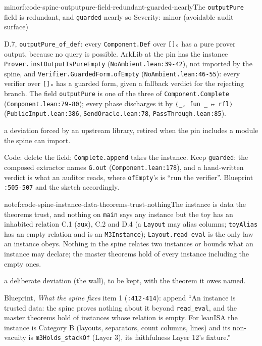 \begin{finding}{minor}{f:code-spine-outputpure-field-redundant-guarded-nearly}{The \texttt{outputPure} field is redundant, and \texttt{guarded} nearly so}
Severity: minor (avoidable audit surface)

D.7, \texttt{outputPure\_\allowbreak{}of\_\allowbreak{}def}: every \texttt{Component.\allowbreak{}Def} over \texttt{[]ₒ} has a pure prover output, because no query is possible. ArkLib at the pin has the instance \texttt{Prover.\allowbreak{}instOutputIsPureEmpty} (\texttt{NoAmbient.\allowbreak{}lean:39-{}42}), not imported by the spine, and \texttt{Verifier.\allowbreak{}GuardedForm.\allowbreak{}ofEmpty} (\texttt{NoAmbient.\allowbreak{}lean:46-{}55}): every verifier over \texttt{[]ₒ} has a guarded form, given a fallback verdict for the rejecting branch. The field \texttt{outputPure} is one of the three of \texttt{Component.\allowbreak{}Complete} (\texttt{Component.\allowbreak{}lean:79-{}80}); every phase discharges it by \texttt{⟨\_\allowbreak{},\allowbreak{} fun \_\allowbreak{} ↦ rfl⟩} (\texttt{PublicInput.\allowbreak{}lean:386}, \texttt{SendOracle.\allowbreak{}lean:78}, \texttt{PassThrough.\allowbreak{}lean:85}).

a deviation forced by an upstream library, retired when the pin includes a module the spine can import.

Code: delete the field; \texttt{Complete.\allowbreak{}append} takes the instance. Keep \texttt{guarded}: the composed extractor names \texttt{G.\allowbreak{}out} (\texttt{Component.\allowbreak{}lean:178}), and a hand-written verdict is what an auditor reads, where \texttt{ofEmpty}'s is \enquote{run the verifier}. Blueprint \texttt{:505-{}507} and the sketch accordingly.

\end{finding}

\begin{finding}{note}{f:code-spine-instance-data-theorems-trust-nothing}{The instance is data the theorems trust, and nothing on \texttt{main} says any instance but the toy has an inhabited relation}
C.1 (\texttt{aux}), C.2 and D.4 (a \texttt{Layout} may alias columns; \texttt{toyAlias} has an empty relation and is an \texttt{M3Instance}); \texttt{Layout.\allowbreak{}read\_\allowbreak{}eval} is the only law an instance obeys. Nothing in the spine relates two instances or bounds what an instance may declare; the master theorems hold of every instance including the empty ones.

a deliberate deviation (the wall), to be kept, with the theorem it owes named.

Blueprint, \emph{What the spine fixes} item 1 (\texttt{:412-{}414}): append \enquote{An instance is trusted data: the spine proves nothing about it beyond \texttt{read\_\allowbreak{}eval}, and the master theorems hold of instances whose relation is empty. For leanISA the instance is Category B (layouts, separators, count columns, lines) and its non-vacuity is \texttt{m3Holds\_\allowbreak{}stackOf} (Layer 3), its faithfulness Layer 12's fixture.}

\end{finding}

